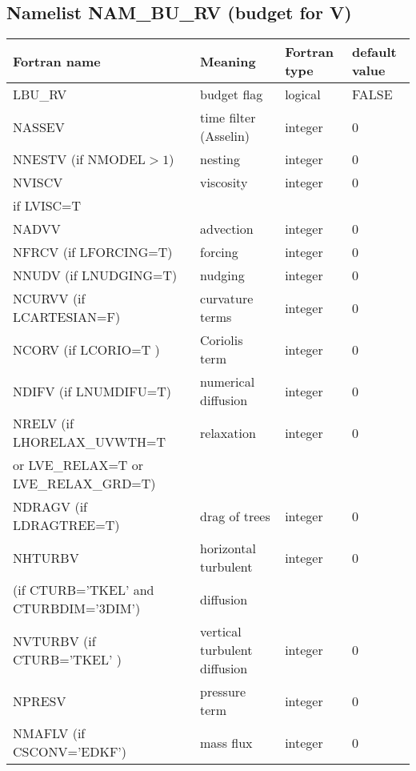 \subsection{Namelist NAM\_BU\_RV (budget for V)}

\begin{longtable} {|p{}|p{}|>{\centering}p{}|p{}<{\centering}|}
\hline
Fortran name & Meaning & Fortran type & default value \\
\hline \hline
\endhead
LBU\_RV  & budget flag & logical & FALSE \index{LBU\_RV!\innam{NAM\_BU\_RV}}\\\hline
NASSEV   & time filter (Asselin)   & integer  &  0 \index{NASSEV!\innam{NAM\_BU\_RV}} \\\hline
NNESTV (if NMODEL$>1$)  & nesting           & integer  &  0 \index{NNESTV!\innam{NAM\_BU\_RV}} \\\hline
NVISCV   & viscosity         & integer  &  0 \index{NVISCV!\innam{NAM\_BU\_RV}}\\
if LVISC=T &  &   &   \\\hline
NADVV   & advection  & integer  &  0  \index{NADVV!\innam{NAM\_BU\_RV}}\\\hline
NFRCV (if LFORCING=T)  & forcing           & integer  &  0 \index{NFRCV!\innam{NAM\_BU\_RV}} \\\hline
NNUDV (if LNUDGING=T)   & nudging           & integer  &  0 \index{NNUDV!\innam{NAM\_BU\_RV}} \\\hline
NCURVV (if LCARTESIAN=F)  & curvature terms   & integer  &  0 \index{NCURVV!\innam{NAM\_BU\_RV}}\\\hline
NCORV (if LCORIO=T )   & Coriolis  term    & integer  &  0 \index{NCORV!\innam{NAM\_BU\_RV}}\\\hline
NDIFV (if LNUMDIFU=T)   & numerical diffusion & integer  &  0 \index{NDIFV!\innam{NAM\_BU\_RV}}\\\hline
NRELV  (if LHORELAX\_UVWTH=T  & relaxation & integer  &  0 \index{NRELV!\innam{NAM\_BU\_RV}}\\ \nopagebreak
or LVE\_RELAX=T or LVE\_RELAX\_GRD=T) &  &   &   \\\hline
NDRAGV (if LDRAGTREE=T) & drag of trees & integer  &  0 \index{NDRAGV!\innam{NAM\_BU\_RV}} \\\hline
NHTURBV  & horizontal turbulent & integer  &  0 \index{NHTURBV!\innam{NAM\_BU\_RV}}\\ \nopagebreak
(if CTURB='TKEL' and CTURBDIM='3DIM') &diffusion &   &  \\\hline
NVTURBV (if CTURB='TKEL' ) & vertical turbulent diffusion & integer  &  0 \index{NVTURBV!\innam{NAM\_BU\_RV}}\\\hline
NPRESV   & pressure term       & integer  &  0 \index{NPRESV!\innam{NAM\_BU\_RV}}    \\\hline
NMAFLV (if CSCONV='EDKF')   & mass flux        & integer  &  0 \index{NMAFLV!\innam{NAM\_BU\_RV}}\\\hline
\end{longtable}

